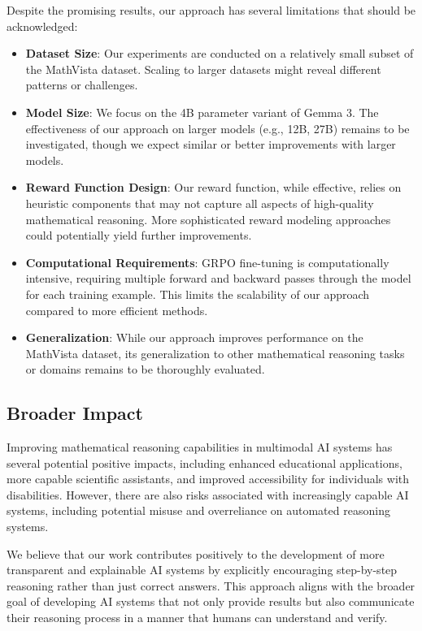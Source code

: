 \documentclass[11pt,a4paper]{article}
\begin{document}
Despite the promising results, our approach has several limitations that should be acknowledged:

\begin{itemize}
    \item \textbf{Dataset Size}: Our experiments are conducted on a relatively small subset of the MathVista dataset. Scaling to larger datasets might reveal different patterns or challenges.
    \item \textbf{Model Size}: We focus on the 4B parameter variant of Gemma 3. The effectiveness of our approach on larger models (e.g., 12B, 27B) remains to be investigated, though we expect similar or better improvements with larger models.
    \item \textbf{Reward Function Design}: Our reward function, while effective, relies on heuristic components that may not capture all aspects of high-quality mathematical reasoning. More sophisticated reward modeling approaches could potentially yield further improvements.
    \item \textbf{Computational Requirements}: GRPO fine-tuning is computationally intensive, requiring multiple forward and backward passes through the model for each training example. This limits the scalability of our approach compared to more efficient methods.
    \item \textbf{Generalization}: While our approach improves performance on the MathVista dataset, its generalization to other mathematical reasoning tasks or domains remains to be thoroughly evaluated.
\end{itemize}

\subsection{Broader Impact}

Improving mathematical reasoning capabilities in multimodal AI systems has several potential positive impacts, including enhanced educational applications, more capable scientific assistants, and improved accessibility for individuals with disabilities. However, there are also risks associated with increasingly capable AI systems, including potential misuse and overreliance on automated reasoning systems.

We believe that our work contributes positively to the development of more transparent and explainable AI systems by explicitly encouraging step-by-step reasoning rather than just correct answers. This approach aligns with the broader goal of developing AI systems that not only provide results but also communicate their reasoning process in a manner that humans can understand and verify.
\end{document}
